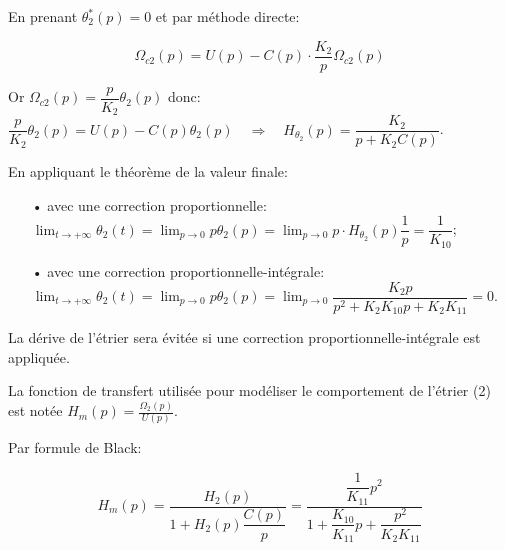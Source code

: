 \ifprof
\begin{corrige}
En prenant $\theta^*_2(p) = 0$ et par méthode directe:

$$ \Omega_{c2}(p) = U(p) - C(p)\cdot \dfrac{K_2}{p}\Omega_{c2}(p) $$

Or $\Omega_{c2}(p) = \dfrac{p}{K_2}\theta_2(p)$ donc:
$ \dfrac{p}{K_2}\theta_2(p) = U(p) - C(p)\theta_2(p) \quad \Rightarrow \quad \boxed{H_{\theta_2}(p) = \dfrac{K_2}{p + K_2 C(p)}} $.

En appliquant le théorème de la valeur finale: 

\begin{itemize}
\item[•] avec une correction proportionnelle: $\displaystyle\lim_{t\to +\infty}\theta_2(t) = \lim_{p\to 0}p\theta_2(p) = \lim_{p\to 0} p\cdot H_{\theta_2}(p)\dfrac{1}{p} = \dfrac{1}{K_{10}}$;
\item[•] avec une correction proportionnelle-intégrale: $\displaystyle\lim_{t\to +\infty}\theta_2(t) = \lim_{p\to 0}p\theta_2(p) = \lim_{p\to 0}\dfrac{K_2 p}{p^2 + K_2K_{10}p + K_2K_{11}} = 0$.
\end{itemize}

La dérive de l'étrier sera évitée si une correction proportionnelle-intégrale est appliquée.
\end{corrige}
\else
\fi
La fonction de transfert utilisée pour modéliser le comportement de l'étrier (2) est notée $H_{m}(p)=\frac{\Omega_{2}(p)}{U(p)}$.

\ifprof
\begin{corrige}
Par formule de Black:

$$ H_{m}(p) = \dfrac{H_2(p)}{1+ H_2(p)\dfrac{C(p)}{p}} = \dfrac{\dfrac{1}{K_{11}}p^2}{1 + \dfrac{K_{10}}{K_{11}}p + \dfrac{p^2}{K_2K_{11}}} $$
\end{corrige}
\else
\fi

